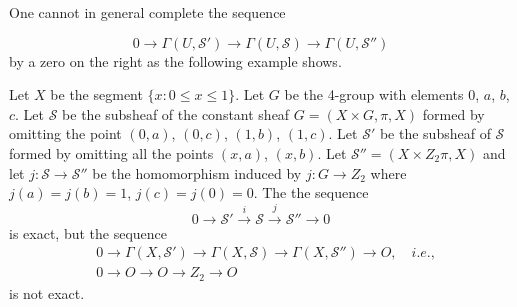 One cannot in general complete the sequence

$$
0 \to \Gamma(U,\mathscr{S}')  \to \Gamma (U, \mathscr{S}) \to \Gamma 
(U, \mathscr{S}'') 
$$
by a zero on the right as the following example shows.

\begin{exam}\label{chap12:exam16}%
Let $X$ be the segment $\{ x:0 \le x \le1 \}$. Let $G$ be the
4-group with elements $0$, $a$, $b$, $c$. Let $\mathscr{S}$ be the subsheaf
of the constant sheaf $G=(X \times G, \pi ,X)$ formed by omitting the
point $(0,a)$, $(0,c)$, $(1,b)$, $(1,c)$. Let $\mathscr{S}'$ be the subsheaf of
$\mathscr{S}$ formed by omitting all the points $(x,a)$,
$(x,b)$. Let\pageoriginale 
$\mathscr{S}''=(X \times Z_2 \pi,X)$ and let $j:\mathscr{S}\to
\mathscr{S}''$ be the homomorphism induced by $j: G \to Z_2$ where
$j(a)=j(b)=1$, $j(c)=j(0)=0$. The the sequence 
$$
0 \to \mathscr{S}' \xrightarrow{i} \mathscr{S}\xrightarrow{j}
\mathscr{S}'' \to 0 
$$
is exact, but the sequence
\begin{align*}
&0 \to \Gamma(X,\mathscr{S}')  \to \Gamma (X, \mathscr{S}) \to \Gamma
  (X, \mathscr{S}'') \to O, \quad i.e.,\\ 
&0 \longrightarrow O \longrightarrow O \longrightarrow Z_2
  \longrightarrow O 
\end{align*}
is not exact.
\end{exam}

